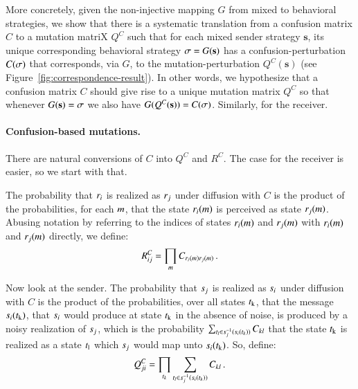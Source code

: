\documentclass[fleqn,reqno,10pt]{article}
\renewcommand{\Smixed}{\ensuremath{\mathrm{\mathbf{s}}}}
\begin{document}
More concretely, given the non-injective mapping $G$ from mixed to
behavioral strategies, we show that there is a systematic translation
from a confusion matrix $C$ to a mutation matriX $Q^C$ such that for
each mixed sender strategy $\Smixed$, its unique corresponding
behavioral strategy $\Sstrat = G(\Smixed)$ has a
confusion-perturbation $C(\sigma)$ that corresponds, via $G$, to the
mutation-perturbation $Q^C(\Smixed)$ (see
Figure~\ref{fig:correspondence-result}). In other words, we
hypothesize that a confusion matrix $C$ should give rise to a unique
mutation matrix $Q^C$ so that whenever $G(\Smixed) = \Sstrat$ we also
have $G(Q^C(\Smixed)) = C(\Sstrat)$. Similarly, for the receiver.

\paragraph{Confusion-based mutations.} There are natural conversions
of $C$ into $Q^C$ and $R^C$. The case for the receiver is easier, so
we start with that.

The probability that $r_i$ is realized as $r_j$ under
diffusion with $C$ is the product of the probabilities, for each
$m$, that the state $r_i(m)$ is perceived as state
$r_j(m)$. Abusing notation by referring to the indices of
states $r_i(m)$ and $r_j(m)$ with
$r_i(m)$ and $r_j(m)$ directly, we define:
\begin{align}
  \label{eq:construction-rec}
  R^C_{ij} = \prod_{m} C_{r_i(m)r_j(m)}\,.
\end{align}

Now look at the sender. The probability that $s_j$ is realized as
$s_i$ under diffusion with $C$ is the product of the
probabilities, over all states $t_{\mathrm{k}}$, that the message
$s_i(t_{\mathrm{k}})$, that $s_i$ would produce at state
$t_{\mathrm{k}}$ in the absence of noise, is produced by a noisy
realization of $s_j$, which is the probability $\sum_{t_l
  \in s_j^{-1}(s_i(t_k))} C_{kl}$ that the state
$t_{\mathrm{k}}$ is realized as a state $t_{\mathrm{l}}$ which $s_j$
would map unto $s_i(t_{\mathrm{k}})$. So, define:
\begin{align}
  \label{eq:construction-sen}
  Q^C_{ji} = \prod_{t_k} \sum_{t_l \in
    s_j^{-1}(s_i(t_k))} C_{kl}\,.
\end{align}
\end{document}
